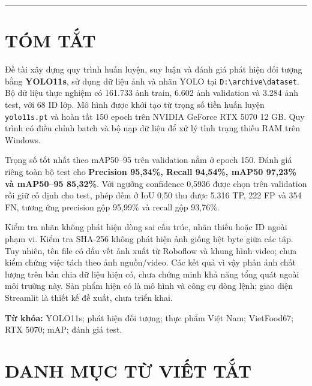 \documentclass[
  vietnamese,
  12pt,
  a4paper,
]{article}
\begin{document}
\begin{center}\rule{0.5\linewidth}{0.5pt}\end{center}

\section{TÓM TẮT}\label{tuxf3m-tux1eaft}

Đề tài xây dựng quy trình huấn luyện, suy luận và đánh giá phát hiện đối
tượng bằng \textbf{YOLO11s}, sử dụng dữ liệu ảnh và nhãn YOLO tại
\texttt{D\allowbreak{}:\allowbreak{}\textbackslash{}\allowbreak{}a\allowbreak{}r\allowbreak{}c\allowbreak{}h\allowbreak{}i\allowbreak{}v\allowbreak{}e\allowbreak{}\textbackslash{}\allowbreak{}d\allowbreak{}a\allowbreak{}t\allowbreak{}a\allowbreak{}s\allowbreak{}e\allowbreak{}t\allowbreak{}}.
Bộ dữ liệu thực nghiệm có 161.733 ảnh train, 6.602 ảnh validation và
3.284 ảnh test, với 68 ID lớp. Mô hình được khởi tạo từ trọng số tiền
huấn luyện
\texttt{y\allowbreak{}o\allowbreak{}l\allowbreak{}o\allowbreak{}1\allowbreak{}1\allowbreak{}s\allowbreak{}.\allowbreak{}p\allowbreak{}t\allowbreak{}}
và hoàn tất 150 epoch trên NVIDIA GeForce RTX 5070 12 GB. Quy trình có
điều chỉnh batch và bộ nạp dữ liệu để xử lý tình trạng thiếu RAM trên
Windows.

Trọng số tốt nhất theo mAP50--95 trên validation nằm ở epoch 150. Đánh
giá riêng toàn bộ test cho \textbf{Precision 95,34\%, Recall 94,54\%,
mAP50 97,23\% và mAP50--95 85,32\%}. Với ngưỡng confidence 0,5936 được
chọn trên validation rồi giữ cố định cho test, phép đếm ở IoU 0,50 thu
được 5.316 TP, 222 FP và 354 FN, tương ứng precision gộp 95,99\% và
recall gộp 93,76\%.

Kiểm tra nhãn không phát hiện dòng sai cấu trúc, nhãn thiếu hoặc ID
ngoài phạm vi. Kiểm tra SHA-256 không phát hiện ảnh giống hệt byte giữa
các tập. Tuy nhiên, tên file có dấu vết ảnh xuất từ Roboflow và khung
hình video; chưa kiểm chứng việc tách theo ảnh nguồn/video. Các kết quả
vì vậy phản ánh chất lượng trên bản chia dữ liệu hiện có, chưa chứng
minh khả năng tổng quát ngoài môi trường này. Sản phẩm hiện có là mô
hình và công cụ dòng lệnh; giao diện Streamlit là thiết kế đề xuất, chưa
triển khai.

\textbf{Từ khóa:} YOLO11s; phát hiện đối tượng; thực phẩm Việt Nam;
VietFood67; RTX 5070; mAP; đánh giá test.

\clearpage\tableofcontents\clearpage

\section{DANH MỤC TỪ VIẾT
TẮT}\label{danh-mux1ee5c-tux1eeb-viux1ebft-tux1eaft}
\end{document}
